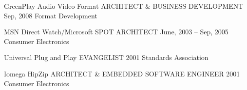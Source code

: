 \begin{cventries}
    \vspace{-1.5mm}
    \cventry
    {GreenPlay Audio Video Format}
    {ARCHITECT \& BUSINESS DEVELOPMENT}
    {Sep, 2008}
    {Format Development}
    {
    \begin{cvitems} %
    \vspace{-5mm}
    \end{cvitems}
    }
    
    \vspace{-1.5mm}
    \cventry
    {MSN Direct Watch/Microsoft SPOT}
    {ARCHITECT}
    {June, 2003 – Sep, 2005}
    {Consumer Electronics}
    {
    \begin{cvitems} %
    \vspace{-5mm}
    \end{cvitems}
    }
    
    \vspace{-1.5mm}
    \cventry
    {Universal Plug and Play}
    {EVANGELIST}
    {2001}
    {Standards Association}
    {
    \begin{cvitems} %
    \vspace{-5mm}
    \end{cvitems}
    }
    
    \vspace{-1.5mm}
    \cventry
    {Iomega HipZip}
    {ARCHITECT \& EMBEDDED SOFTWARE ENGINEER}
    {2001}
    {Consumer Electronics}
    {
    \begin{cvitems} %
    \vspace{-5mm}
    \end{cvitems}
    }
    \end{cventries}
    \vspace{-2mm}